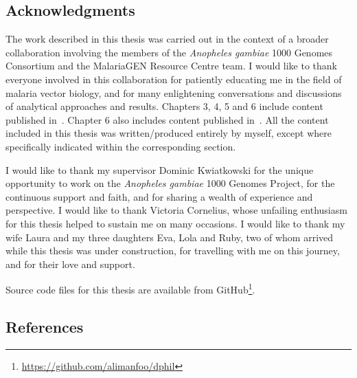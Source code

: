 \begin{refsection}
\chapter*{Acknowledgments}


The work described in this thesis was carried out in the context of a broader collaboration involving the members of the \textit{Anopheles gambiae} 1000 Genomes Consortium and the MalariaGEN Resource Centre team.
%
I would like to thank everyone involved in this collaboration for patiently educating me in the field of malaria vector biology, and for many enlightening conversations and discussions of analytical approaches and results.
%
Chapters 3, 4, 5 and 6 include content published in~\textcite{Ag1000G2017}.
%
Chapter 6 also includes content published in~\textcite{Clarkson2018}.
%
All the content included in this thesis was written/produced entirely by myself, except where specifically indicated within the corresponding section.


I would like to thank my supervisor Dominic Kwiatkowski for the unique opportunity to work on the \textit{Anopheles gambiae} 1000 Genomes Project, for the continuous support and faith, and for sharing a wealth of experience and perspective.
%
I would like to thank Victoria Cornelius, whose unfailing enthusiasm for this thesis helped to sustain me on many occasions.
%
I would like to thank my wife Laura and my three daughters Eva, Lola and Ruby, two of whom arrived while this thesis was under construction, for travelling with me on this journey, and for their love and support.


Source code files for this thesis are available from GitHub\footnote{\url{https://github.com/alimanfoo/dphil}}.


\section*{References}




\end{refsection}
